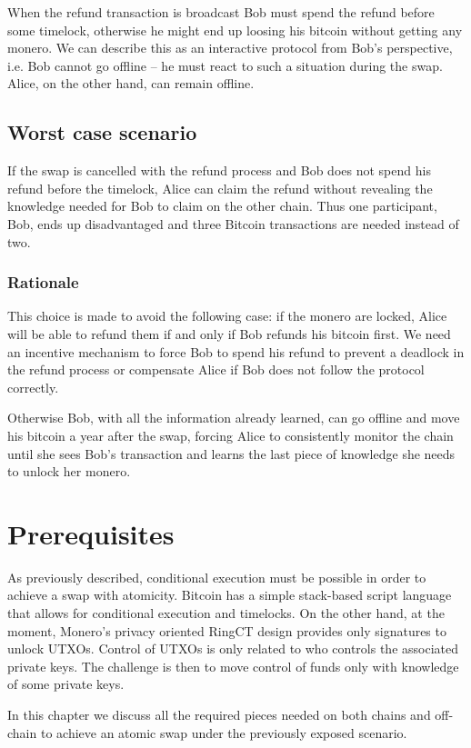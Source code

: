 \documentclass{llncs}
\begin{document}
When the refund transaction is broadcast Bob must spend the refund before some timelock, otherwise he might end up loosing his bitcoin without getting any monero.  We can describe this as an interactive protocol from Bob's perspective, i.e. Bob cannot go offline -- he must react to such a situation during the swap. Alice, on the other hand, can remain offline.

\subsection{Worst case scenario}
If the swap is cancelled with the refund process and Bob does not spend his refund before the timelock, Alice can claim the refund without revealing the knowledge needed for Bob to claim on the other chain. Thus one participant, Bob, ends up disadvantaged and three Bitcoin transactions are needed instead of two.

\subsubsection{Rationale}
\label{worstCaseRationale}
This choice is made to avoid the following case: if the monero are locked, Alice will be able to refund them if and only if Bob refunds his bitcoin first. We need an incentive mechanism to force Bob to spend his refund to prevent a deadlock in the refund process or compensate Alice if Bob does not follow the protocol correctly.

Otherwise Bob, with all the information already learned, can go offline and move his bitcoin a year after the swap, forcing Alice to consistently monitor the chain until she sees Bob's transaction and learns the last piece of knowledge she needs to unlock her monero.

\section{Prerequisites}
\label{prerequisites}
As previously described, conditional execution must be possible in order to achieve a swap with atomicity. Bitcoin has a simple stack-based script language that allows for conditional execution and timelocks. On the other hand, at the moment, Monero's privacy oriented RingCT design provides only signatures to unlock UTXOs. Control of UTXOs is only related to who controls the associated private keys. The challenge is then to move control of funds only with knowledge of some private keys.

In this chapter we discuss all the required pieces needed on both chains and off-chain to achieve an atomic swap under the previously exposed scenario.
\end{document}
